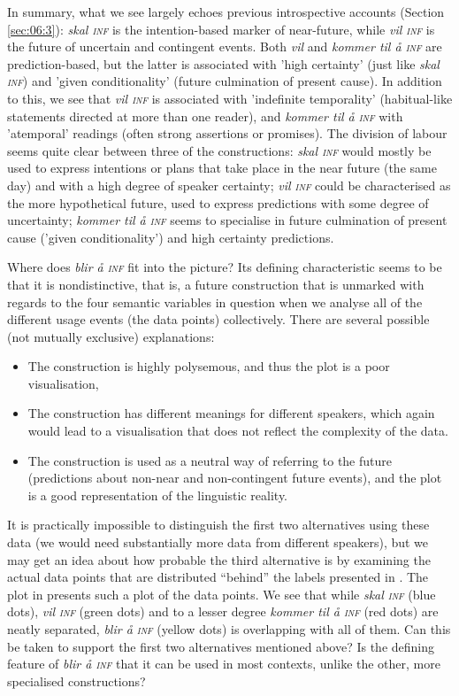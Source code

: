 \documentclass[output=paper,colorlinks,citecolor=brown]{langscibook}
\begin{document}
In summary, what we see largely echoes previous introspective accounts (Section \ref{sec:06:3}): \textit{skal \textsc{inf}} is the intention-based marker of near-future, while \textit{vil \textsc{inf}} is the future of uncertain and contingent events. Both \textit{vil} and \textit{kommer til å \textsc{inf}} are prediction-based, but the latter is associated with 'high certainty' (just like \textit{skal \textsc{inf}}) and 'given conditionality' (future culmination of present cause). In addition to this, we see that \textit{vil \textsc{inf}} is associated with 'indefinite temporality' (habitual-like statements directed at more than one reader), and \textit{kommer til å \textsc{inf}} with 'atemporal' readings (often strong assertions or promises). The division of labour seems quite clear between three of the constructions: \textit{skal \textsc{inf}} would mostly be used to express intentions or plans that take place in the near future (the same day) and with a high degree of speaker certainty; \textit{vil \textsc{inf}} could be characterised as the more hypothetical future, used to express predictions with some degree of uncertainty; \textit{kommer til å \textsc{inf}} seems to specialise in future culmination of present cause ('given conditionality') and high certainty predictions.

Where does \textit{blir å \textsc{inf}} fit into the picture? Its defining characteristic seems to be that it is nondistinctive, that is, a future construction that is unmarked with regards to the four semantic variables in question when we analyse all of the different usage events (the data points) collectively. There are several possible (not mutually exclusive) explanations:
\begin{itemize}
\item The construction is highly polysemous, and thus the plot is a poor visualisation,
\item The construction has different meanings for different speakers, which again would lead to a visualisation that does not reflect the complexity of the data.
\item The construction is used as a neutral way of referring to the future (predictions about non-near and non-contingent future events), and the plot is a good representation of the linguistic reality.
\end{itemize}
It is practically impossible to distinguish the first two alternatives using these data (we would need substantially more data from different speakers), but we may get an idea about how probable the third alternative is by examining the actual data points that are distributed “behind” the labels presented in . The plot in  presents such a plot of the data points. We see that while \textit{skal \textsc{inf}} (blue dots), \textit{vil \textsc{inf}} (green dots) and to a lesser degree \textit{kommer til å \textsc{inf}} (red dots) are neatly separated, \textit{blir å \textsc{inf}} (yellow dots) is overlapping with all of them. Can this be taken to support the first two alternatives mentioned above? Is the defining feature of \textit{blir å \textsc{inf}} that it can be used in most contexts, unlike the other, more specialised constructions?
\end{document}
